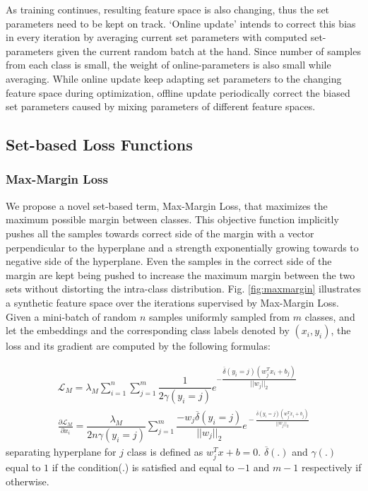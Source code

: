 \documentclass[10pt,twocolumn,letterpaper]{article}
\newcommand{\margin}{Max-Margin Loss\xspace}
\begin{document}
As training continues, resulting feature space is also changing, thus the set parameters need to be kept on track. `Online update' intends to correct this bias in every iteration by averaging current set parameters with computed set-parameters given the current random batch at the hand. Since number of samples from each class is small, the weight of online-parameters is also small while averaging. While online update keep adapting set parameters to the changing feature space during optimization, offline update periodically correct the biased set parameters caused by mixing parameters of different feature spaces.



\subsection{Set-based Loss Functions}

\subsubsection{\margin}

We propose a novel set-based term, \margin, that maximizes the maximum possible margin between classes. This objective function implicitly pushes all the samples towards correct side of the margin with a vector perpendicular to the hyperplane and a strength exponentially growing towards to negative side of the hyperplane. Even the samples in the correct side of the margin are kept being pushed to increase the maximum margin between the two sets without distorting the intra-class distribution. Fig. \ref{fig:maxmargin} illustrates a synthetic feature space over the iterations supervised by \margin. Given a mini-batch of random $n$ samples uniformly sampled from $m$ classes,  and let the embeddings and the corresponding class labels denoted by $(x_i, y_i)$, the loss and its gradient are computed by the following formulas:

\begin{align}
\mathcal{L}_M = \lambda_M \sum_{i=1}^n \sum_{j=1}^m \dfrac{1}{2\gamma(y_i = j)}e^{- \dfrac{\overline{\delta}(y_i = j)(w_j^Tx_i+b_j)}{||w_j||_2}}\\
\frac{\partial \mathcal{L}_M}{\partial x_i}\! =\!\!\dfrac{\lambda_M}{2n\gamma(y_i = j)}\! \sum_{j=1}^m \! \dfrac{-w_j\overline{\delta}(y_i\!\! =\!\! j)}{||w_j||_2}e^{\!\!- \frac{\overline{\delta}(y_i = j)(w_j^Tx_i+b_j)}{||w_j||_2}}
\end{align}
separating hyperplane for $j$ class is defined as $w_j^Tx+b = 0$. $\overline{\delta}(.)$ and $\gamma(.)$ equal to $1$ if the condition(.) is satisfied and equal to $-1$ and $m-1$ respectively if otherwise. 
\end{document}
